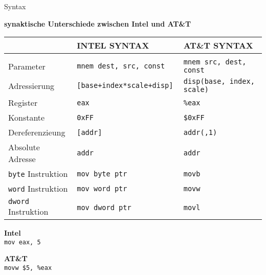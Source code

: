 \begin{frame}{Syntax}
	\begin{center}
	\textbf{synaktische Unterschiede zwischen Intel und AT\&T}
	\end{center}

	\begin{small}
	\begin{table}[h]	%
	\begin{tabular}{lll}
	\\	                          & INTEL SYNTAX                  & AT\&T SYNTAX
	\\\hline
	\\	Parameter 								& \tt mnem dest, src, const  	  & \tt mnem src, dest, const
	\\  Adressierung  				  	&	\tt [base+index*scale+disp]   & \tt disp(base, index, scale)
	\\	Register      						& \tt eax              					& \tt \%eax
	\\	Konstante     						& \tt 0xFF             					& \tt \$0xFF
	\\	Dereferenzieung   				& \tt [addr]           					& \tt addr(,1)
	\\	Absolute Adresse 			 	  & \tt addr             					& \tt *addr
	\\	{\tt byte} Instruktion    & \tt mov byte ptr     					& \tt movb
	\\	{\tt word} Instruktion    & \tt mov word ptr     					& \tt movw
	\\  {\tt dword} Instruktion   & \tt mov dword ptr    					& \tt movl
	\end{tabular}
	\end{table}
	\end{small}

	\begin{multicols}{2}
		\begin{minipage}{5cm}
			\begin{center}
			\textbf{Intel}\\
				\texttt{mov    eax, 5}
			\end{center}
		\end{minipage}

		\begin{minipage}{5cm}
			\begin{center}
			\textbf{AT\&T}\\
				\texttt{movw   \$5, \%eax}
			\end{center}
		\end{minipage}
	\end{multicols}

\end{frame}
